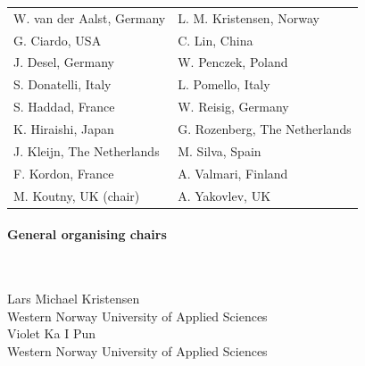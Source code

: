 \documentclass[10pt]{article}
\newcommand{\styleUniv}[1]{\textcolor{black!75}{#1}}
\begin{document}
\begin{multicols}{2}
\hspace*{-2em}\begin{tabular}{ll}
W. van der Aalst, Germany   & L. M. Kristensen, Norway \\
G. Ciardo, USA              & C. Lin, China \\
J. Desel, Germany           & W. Penczek, Poland \\
S. Donatelli, Italy         & L. Pomello, Italy \\
S. Haddad, France           & W. Reisig, Germany \\
K. Hiraishi, Japan          & G. Rozenberg, The Netherlands \\
J. Kleijn, The Netherlands  & M. Silva, Spain \\
F. Kordon, France           & A. Valmari, Finland \\
M. Koutny, UK (chair)       & A. Yakovlev, UK \\

\end{tabular}
\end{multicols}
\paragraph*{General organising chairs}$ $

\vspace*{0.25em}
\noindent Lars Michael Kristensen \\
\indent \styleUniv{Western Norway University of Applied Sciences}\\
\noindent Violet Ka I Pun \\
\indent \styleUniv{Western Norway University of Applied Sciences}


\end{document}
